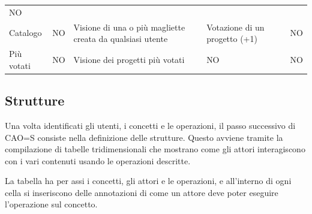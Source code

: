 \documentclass[12pt,italian,]{report}
\begin{document}
\begin{longtable}[]{@{}lllll@{}}
\begin{minipage}[t]{0.17\columnwidth}
NO\strut
\end{minipage}\tabularnewline
\begin{minipage}[t]{0.17\columnwidth}\raggedright
Catalogo\strut
\end{minipage} & \begin{minipage}[t]{0.17\columnwidth}\raggedright
NO\strut
\end{minipage} & \begin{minipage}[t]{0.17\columnwidth}\raggedright
Visione di una o più magliette creata da qualsiasi utente\strut
\end{minipage} & \begin{minipage}[t]{0.17\columnwidth}\raggedright
Votazione di un progetto (+1)\strut
\end{minipage} & \begin{minipage}[t]{0.17\columnwidth}\raggedright
NO\strut
\end{minipage}\tabularnewline
\begin{minipage}[t]{0.17\columnwidth}\raggedright
Più votati\strut
\end{minipage} & \begin{minipage}[t]{0.17\columnwidth}\raggedright
NO\strut
\end{minipage} & \begin{minipage}[t]{0.17\columnwidth}\raggedright
Visione dei progetti più votati\strut
\end{minipage} & \begin{minipage}[t]{0.17\columnwidth}\raggedright
NO\strut
\end{minipage} & \begin{minipage}[t]{0.17\columnwidth}\raggedright
NO\strut
\end{minipage}\tabularnewline
\bottomrule
\end{longtable}

\hypertarget{strutture}{%
\subsection{Strutture}\label{strutture}}

Una volta identificati gli utenti, i concetti e le operazioni, il passo
successivo di CAO=S consiste nella definizione delle strutture. Questo
avviene tramite la compilazione di tabelle tridimensionali che mostrano
come gli attori interagiscono con i vari contenuti usando le operazioni
descritte.

La tabella ha per assi i concetti, gli attori e le operazioni, e
all'interno di ogni cella si inseriscono delle annotazioni di come un
attore deve poter eseguire l'operazione sul concetto.
\end{document}
